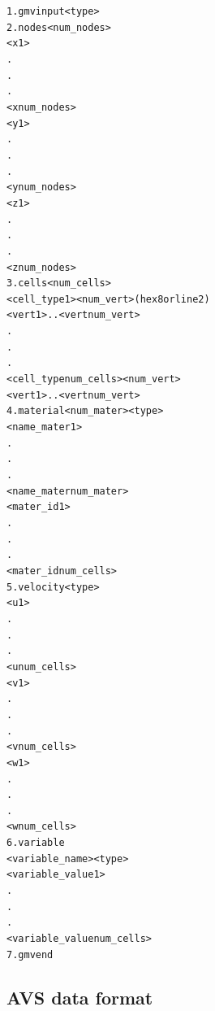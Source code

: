\documentclass[10pt]{article}
\begin{document}
    \small
    \begin{alltt}
    1. gmvinput <type>
    2. nodes <num_nodes>
       <x 1>
       .
       .
       .
       <x num_nodes>
       <y 1>
       .
       .
       .
       <y num_nodes>
       <z 1>
       .
       .
       .
       <z num_nodes>
    3. cells <num_cells>
       <cell_type 1> <num_vert> (hex 8 or line 2)
          <vert 1> .. <vert num_vert>
       .
       .
       .
       <cell_type num_cells> <num_vert>
          <vert 1> .. <vert num_vert>
    4. material <num_mater> <type> 
       <name_mater 1>
       .
       .
       .
       <name_mater num_mater>
       <mater_id 1> 
       .
       .
       .
       <mater_id num_cells> 
    5. velocity <type>  
       <u 1>
       .
       .
       .
       <u num_cells>
       <v 1>
       .
       .
       .
       <v num_cells>
       <w 1>
       .
       .
       .
       <w num_cells>
    6. variable 
       <variable_name> <type> 
          <variable_value 1>
       .
       .
       .
          <variable_value num_cells>
    7. gmvend 
    \end{alltt}
    \normalsize 

    \subsection{AVS data format}
    \label{avsformat}
\end{document}
